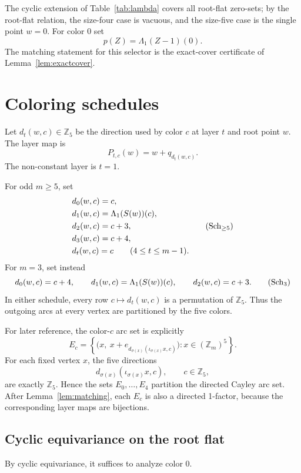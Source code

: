\documentclass[11pt]{article}
\theoremstyle{definition}
\newcommand{\Zfive}{\mathbb Z_5}
\begin{document}
The cyclic extension of Table~\ref{tab:lambda} covers all root-flat zero-sets; by the root-flat
relation, the size-four case is vacuous, and the size-five case is the single point \(w=0\).  For
color 0 set
\[
p(Z)=\Lambda_1(Z-1)(0).
\]
The matching statement for this selector is the exact-cover certificate of Lemma~\ref{lem:exactcover}.

\section{Coloring schedules}\label{sec:schedules}

Let \(d_t(w,c)\in\Zfive\) be the direction used by color \(c\) at layer \(t\) and root point \(w\).
The layer map is
\[
P_{t,c}(w)=w+q_{d_t(w,c)}.
\]
The non-constant layer is \(t=1\).


For odd \(m\ge 5\), set
\[
\begin{aligned}
&d_0(w,c)=c,\\
&d_1(w,c)=\Lambda_1(S(w))(c),\\
&d_2(w,c)=c+3,\\
&d_3(w,c)=c+4,\\
&d_t(w,c)=c\qquad(4\le t\le m-1).
\end{aligned}
\tag{$\mathrm{Sch}_{\ge 5}$}
\]
For \(m=3\), set instead
\[
 d_0(w,c)=c+4,
\qquad d_1(w,c)=\Lambda_1(S(w))(c),
\qquad d_2(w,c)=c+3.
\tag{$\mathrm{Sch}_3$}
\]
In either schedule, every row \(c\mapsto d_t(w,c)\) is a permutation of \(\Zfive\).  Thus the outgoing
arcs at every vertex are partitioned by the five colors.

For later reference, the color-\(c\) arc set is explicitly
\[
E_c=\left\{\bigl(x,\ x+e_{d_{\sigma(x)}(\iota_{\sigma(x)}x,c)}\bigr):
x\in(\mathbb Z_m)^5\right\}.
\tag{$E_c$}
\]
For each fixed vertex \(x\), the five directions
\[
d_{\sigma(x)}(\iota_{\sigma(x)}x,c),\qquad c\in\Zfive,
\]
are exactly \(\Zfive\).  Hence the sets \(E_0,\ldots,E_4\) partition the directed Cayley arc set.
After Lemma~\ref{lem:matching}, each \(E_c\) is also a directed 1-factor, because the corresponding
layer maps are bijections.


\subsection{Cyclic equivariance on the root flat}\label{subsec:cyclic-equivariance}

By cyclic equivariance, it suffices to analyze color \(0\).
\end{document}
